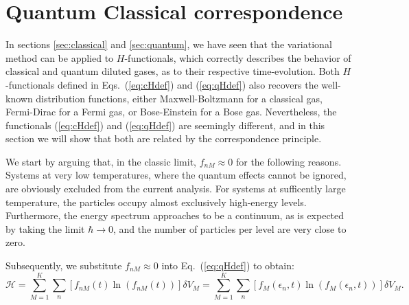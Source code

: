 

\section{Quantum Classical correspondence}\label{sec:qccorrespondence}

In sections \ref{sec:classical} and \ref{sec:quantum}, we have seen that the variational
method can be applied to $H$-functionals, which correctly describes the behavior of
classical and quantum diluted gases, as to their respective time-evolution.
Both $H$-functionals defined in Eqs.~(\ref{eq:cHdef}) and
(\ref{eq:qHdef}) also recovers the well-known distribution functions, either Maxwell-Boltzmann
for a classical gas, Fermi-Dirac for a Fermi gas, or Bose-Einstein for a Bose gas. Nevertheless,
the functionals (\ref{eq:cHdef}) and
(\ref{eq:qHdef}) are seemingly different, and in this section we will show that both are
related by the correspondence principle.

We start by arguing that, in the classic limit, $f_{nM}\approx0$ for the following reasons.
Systems at very low temperatures, where the quantum effects cannot be ignored, are obviously excluded
from the current analysis. For systems at sufficently large temperature, the particles
occupy almost exclusively high-energy levels. 
Furthermore, the energy spectrum approaches to be a continuum, as is expected by taking the limit
$\hbar\to0$, and the number of particles per level are very close to zero.

Subsequently, we substitute $f_{nM}\approx0$ into Eq.~(\ref{eq:qHdef}) to obtain:
%
\begin{equation}\label{h-quantic2}
    \mathcal{H}= \sum_{M=1}^{K} \sum_n
    \left[ f_{nM}(t)\ln \left(f_{nM}(t)\right)\right] \delta V_M
    =\sum_{M=1}^{K} \sum_n
    \left[ f_{M}(\epsilon_n,t) \ln \left( f_{M}(\epsilon_n,t)\right)\right] \delta V_M.
\end{equation}
%



\color{blue}



